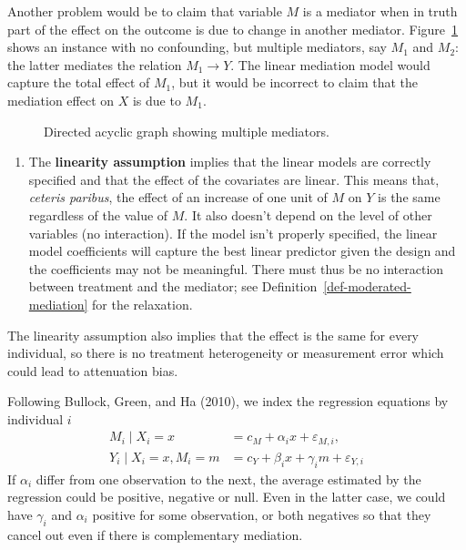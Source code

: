 \documentclass[
  11pt,
  letterpaper,
]{scrbook}
\providecommand{\tightlist}{%
  \setlength{\itemsep}{0pt}\setlength{\parskip}{0pt}}\usepackage{longtable,booktabs,array}
\theoremstyle{definition}
\theoremstyle{definition}
\theoremstyle{remark}
\begin{document}
Another problem would be to claim that variable \(M\) is a mediator when
in truth part of the effect on the outcome is due to change in another
mediator. Figure~\ref{fig-dag2} shows an instance with no confounding,
but multiple mediators, say \(M_1\) and \(M_2\): the latter mediates the
relation \(M_1 \to Y\). The linear mediation model would capture the
total effect of \(M_1\), but it would be incorrect to claim that the
mediation effect on \(X\) is due to \(M_1\).

\begin{figure}[ht!]


\caption{\label{fig-dag2}Directed acyclic graph showing multiple
mediators.}

\end{figure}%

\begin{enumerate}
\def\labelenumi{\arabic{enumi}.}
\setcounter{enumi}{1}
\tightlist
\item
  The \textbf{linearity assumption} implies that the linear models are
  correctly specified and that the effect of the covariates are linear.
  This means that, \emph{ceteris paribus}, the effect of an increase of
  one unit of \(M\) on \(Y\) is the same regardless of the value of
  \(M\). It also doesn't depend on the level of other variables (no
  interaction). If the model isn't properly specified, the linear model
  coefficients will capture the best linear predictor given the design
  and the coefficients may not be meaningful. There must thus be no
  interaction between treatment and the mediator; see
  Definition~\ref{def-moderated-mediation} for the relaxation.
\end{enumerate}

The linearity assumption also implies that the effect is the same for
every individual, so there is no treatment heterogeneity or measurement
error which could lead to attenuation bias.

Following Bullock, Green, and Ha (2010), we index the regression
equations by individual \(i\) \begin{align*}
M_i\mid X_i=x &= c_M + \alpha_i x + \varepsilon_{M,i},\\
Y_i \mid X_i=x, M_i=m &=  c_Y + \beta_i x + \gamma_i m + \varepsilon_{Y,i}
\end{align*} If \(\alpha_i\) differ from one observation to the next,
the average estimated by the regression could be positive, negative or
null. Even in the latter case, we could have \(\gamma_i\) and
\(\alpha_i\) positive for some observation, or both negatives so that
they cancel out even if there is complementary mediation.
\end{document}
